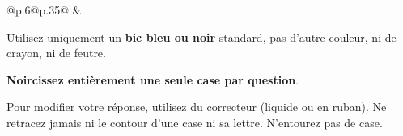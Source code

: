 \documentclass[11pt,french,a4paper,twoside]{article}
\begin{document}
\begin{examcopy}[2]
\begin{tabular}{@{}p{.6\textwidth}@{\hspace{.05\textwidth}}p{.35\textwidth}@{}}
		\fbox{\begin{minipage}{\linewidth}%
				      \vspace{1.5\baselineskip}\namefielddots{}%
				      \vspace*{1mm}%
			      \end{minipage}} & \hfill{}\vspace{1ex}
	\end{tabular}

	\vspace{1em}

	Utilisez uniquement un \textbf{bic bleu ou noir} standard, pas d'autre couleur, ni de crayon, ni de feutre.

	\textbf{Noircissez entièrement une seule case par question}.

	Pour modifier votre réponse, utilisez du correcteur (liquide ou en ruban).
	Ne retracez jamais ni le contour d'une case ni sa lettre.
	N'entourez pas de case.

	\hrulefill{}

	\vspace{1em}

	\AMCform{}
	\AMCcleardoublepage{}

\end{examcopy}
\end{document}
